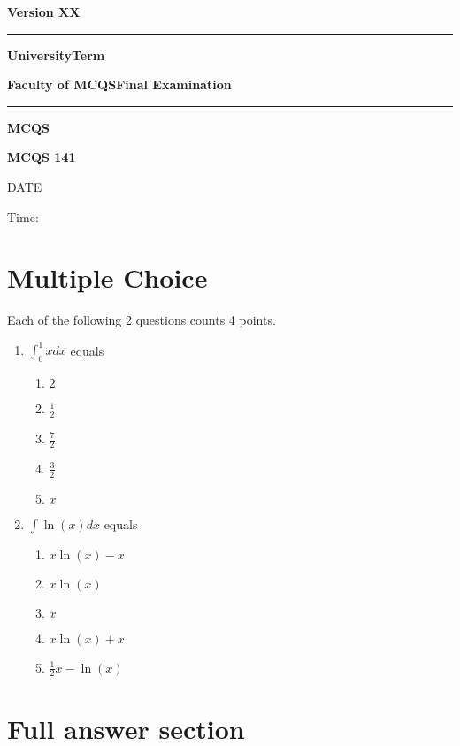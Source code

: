 \documentclass[11pt]{article}
\newcommand{\correct}
{
}
\begin{document}
\newpage
\thispagestyle{empty}
\textbf{Version XX}\\
\hrule\bigskip

{\Large \bf University}\hfill {\Large \bf Term}\medskip

{\Large \bf Faculty of MCQS}\hfill {\Large \bf Final Examination}
\bigskip

\hrule
\medskip

\vskip 1cm

 \begin{center}{\Large \bf MCQS%
\bigskip

{\large \bf MCQS 141}%
\bigskip

DATE %
\medskip

Time: } %
\end{center}

\newpage

\section{Multiple Choice}

Each of the following 2 questions counts 4 points.

\begin{enumerate}
\item $\int_0^1 x dx$ equals\\
  \begin{multicols}{5} 
  \begin{enumerate}
  \item $2$
  \item $\frac{1}{2}$\correct
  \item $\frac{7}{2}$
  \item $\frac{3}{2}$
  \item $x$
  \end{enumerate}
  \end{multicols}

\item $\int \ln(x) dx$ equals\\
  \begin{multicols}{5} 
  \begin{enumerate}
  \item $x\ln(x)-x$\correct
  \item $x\ln(x)$
  \item $x$
  \item $x\ln(x)+x$\correct
  \item $\frac{1}{2}x-\ln(x)$
  \end{enumerate}
  \end{multicols}


\end{enumerate}

\newpage
\section{Full answer section}
\end{document}
